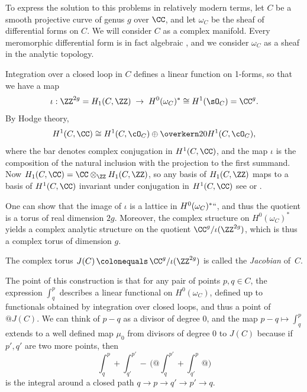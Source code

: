 To express the solution to this problems in relatively modern terms,
let $C$ be a smooth projective curve of genus $g$ over $\CC$, and let
$\omega_{C}$ be the sheaf of differential forms on $C$. We will
consider $C$ as a
complex manifold.
%
%
Every meromorphic differential form is in fact algebraic
\cite{SerreGAGA}, and we consider $\omega_{C}$ as a sheaf in the analytic topology.

Integration
%
over a closed loop in $C$ defines a linear function on 1-forms, so that we have a map
$$
\iota: \ZZ^{2g} = H_1(C,\ZZ) \; \to \;  H^0(\omega_C)^* \cong H^1(\sO_C) = \CC^{g}.
$$
By Hodge theory,
%
$$
H^1(C, \CC) \cong H^1(C, \cO_C) \oplus \overkern20{H^1(C, \cO_C)}
,
$$
where the bar denotes complex conjugation in $H^1(C, \CC)$, and the map $\iota$ is the composition of
 the natural inclusion with the projection to the first summand.
 Now
$H_1(C,\CC) = \CC\otimes_\ZZ H_1(C,\ZZ)$, so any basis of $H_1(C,\ZZ)$ maps to a basis of
$H^1(C, \CC)$ invariant under conjugation in $H^1(C, \CC)$\emdash
see \cite{Voisin} or \cite[p.\,116]{Griffiths-Harris1978}.

One can show that the image of $\iota$ is a
%
lattice in $H^0(\omega_C)^*` `$, and thus the quotient
is a torus of real dimension $2g$.
Moreover, the
complex structure on $H^0(\omega_C)^*$ yields a complex analytic structure on the quotient $\CC^{g}/\iota(\ZZ^{2g})$, which is thus a complex torus of  dimension $g$.
%

\begin{definition}
\hskip-3pt
The complex torus $J(C) \,{\colonequals}\, \CC^{g}/\iota(\ZZ^{2g})$
%
%
is called the \emph{Jacobian} of~$C$.%
\unif
\end{definition}

The point of this construction is that for any pair of points $p, q
\in C$, the expression $\int_q^p$ describes a linear functional on
$H^0(\omega_C)$, defined up to functionals obtained by integration
over closed loops, and thus a point of $@J(C)$. We can think of $p-q$
as a divisor of
degree 0, and the map $p-q \mapsto \int_q^p$ extends to a well defined map $\mu_0$ from divisors of degree 0 to $J(C)$ because if $p',q'$ are two more points, then
{\meshing
$$
\int_q^p +\int_{q'}^{p'} \! - \,\biggl(@\int_q^{p'} +\int_{q'}^p@\biggr)
$$}%
is the integral around a closed path $q\to p\to q'\to p' \to q$.

